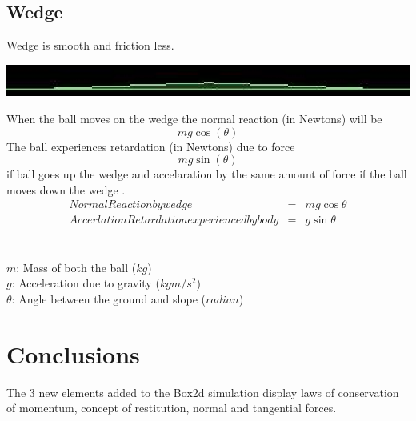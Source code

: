 \documentclass[11pt]{article}
\begin{document}
\subsection{Wedge\cite{ref3}}
Wedge is smooth and friction less.
\newline 
\begin{center}
\includegraphics{wedge}
\end{center}
When the ball moves on the wedge the normal reaction (in Newtons) will be \[ mg\cos(\theta)\] 
The ball experiences  retardation (in Newtons) due to force\[ mg\sin(\theta)\] if ball goes up the wedge and  accelaration  by the same amount of force  if the ball moves down the wedge .
\begin{eqnarray}
Normal Reaction by wedge & = & mg\cos\theta \\
Accerlation Retardation experienced by body & =  & g\sin\theta
\end{eqnarray}
\\
\\
$m$: Mass of both the ball ($kg$) \\
$g$: Acceleration due to gravity ($kgm/s^2$) \\
$\theta$: Angle between the ground and slope ($radian$)\\
\section{Conclusions}
The 3 new elements added to the Box2d simulation display laws of conservation of momentum, concept of restitution, normal and tangential forces.  


\end{document}
